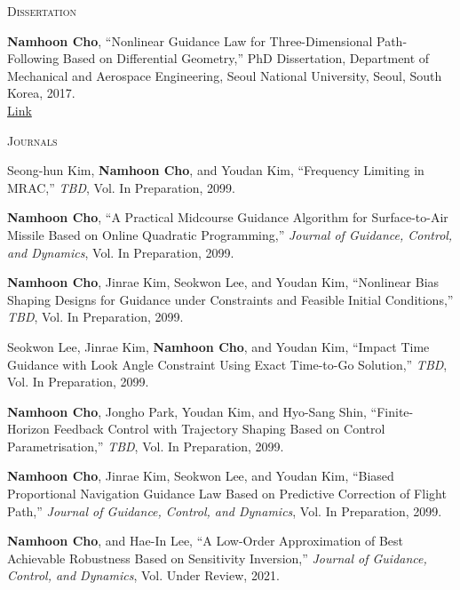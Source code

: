 \textsc{Dissertation}
\vspace{0.5em}
\begin{enumerate}[label={[}\arabic*{]}]
\item \textbf{Namhoon Cho}, ``Nonlinear Guidance Law for Three-Dimensional Path-Following Based on Differential Geometry,'' PhD Dissertation, Department of Mechanical and Aerospace Engineering, Seoul National University, Seoul, South Korea, 2017. \\
 \href{https://hdl.handle.net/10371/118598}{Link}

\end{enumerate}\vspace{0.5em}
\textsc{Journals}
\vspace{0.5em}
\begin{enumerate}[itemsep=0.5em, label={[}J\arabic*{]}]\item Seong-hun Kim, \textbf{Namhoon Cho}, and Youdan Kim, ``Frequency Limiting in MRAC,'' \textit{TBD}, Vol. In Preparation, 2099. 

\item \textbf{Namhoon Cho}, ``A Practical Midcourse Guidance Algorithm for Surface-to-Air Missile Based on Online Quadratic Programming,'' \textit{Journal of Guidance, Control, and Dynamics}, Vol. In Preparation, 2099. 

\item \textbf{Namhoon Cho}, Jinrae Kim, Seokwon Lee, and Youdan Kim, ``Nonlinear Bias Shaping Designs for Guidance under Constraints and Feasible Initial Conditions,'' \textit{TBD}, Vol. In Preparation, 2099. 

\item Seokwon Lee, Jinrae Kim, \textbf{Namhoon Cho}, and Youdan Kim, ``Impact Time Guidance with Look Angle Constraint Using Exact Time-to-Go Solution,'' \textit{TBD}, Vol. In Preparation, 2099. 

\item \textbf{Namhoon Cho}, Jongho Park, Youdan Kim, and Hyo-Sang Shin, ``Finite-Horizon Feedback Control with Trajectory Shaping Based on Control Parametrisation,'' \textit{TBD}, Vol. In Preparation, 2099. 

\item \textbf{Namhoon Cho}, Jinrae Kim, Seokwon Lee, and Youdan Kim, ``Biased Proportional Navigation Guidance Law Based on Predictive Correction of Flight Path,'' \textit{Journal of Guidance, Control, and Dynamics}, Vol. In Preparation, 2099. 

\item \textbf{Namhoon Cho}, and Hae-In Lee, ``A Low-Order Approximation of Best Achievable Robustness Based on Sensitivity Inversion,'' \textit{Journal of Guidance, Control, and Dynamics}, Vol. Under Review, 2021. 


\end{enumerate}
